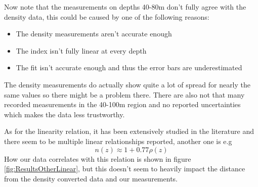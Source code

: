 Now note that the measurements on depths 40-80m don't fully agree with the density data, 
this could be caused by one of the following reasons:
\begin{itemize}
	\item The density measurements aren't accurate enough
	\item The index isn't fully linear at every depth
	\item The fit isn't accurate enough and thus the error bars are underestimated
\end{itemize}
The density measurements do actually show quite a lot of spread for
nearly the same values so there might be a problem there. There are
also not that many recorded measurements in the 40-100m region and no reported
uncertainties which makes the data less trustworthy.  

As for the linearity relation, it has been extensively studied in the literature
\cite{KOVACS1995245} and there seem to be multiple linear relationships reported,
another one is e.g
\begin{equation}
  n(z) \approx 1 + 0.77\rho(z)
\end{equation}
How our data correlates with this relation is shown in figure \ref{fig:ResultsOtherLinear}, but this
doesn't seem to heavily impact the distance from the density converted data and our measurements.
